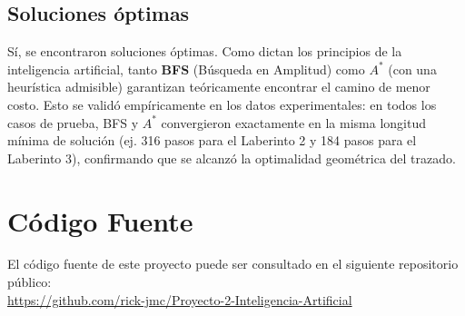 \documentclass[12pt,a4paper]{article}
\begin{document}
\subsection{Soluciones óptimas}
Sí, se encontraron soluciones óptimas. Como dictan los principios de la inteligencia artificial, tanto \textbf{BFS} (Búsqueda en Amplitud) como \textbf{$A^*$} (con una heurística admisible) garantizan teóricamente encontrar el camino de menor costo. Esto se validó empíricamente en los datos experimentales: en todos los casos de prueba, BFS y $A^*$ convergieron exactamente en la misma longitud mínima de solución (ej. 316 pasos para el Laberinto 2 y 184 pasos para el Laberinto 3), confirmando que se alcanzó la optimalidad geométrica del trazado.

\section{Código Fuente}
El código fuente de este proyecto puede ser consultado en el siguiente repositorio público: \\
\url{https://github.com/rick-jmc/Proyecto-2-Inteligencia-Artificial}
\end{document}
